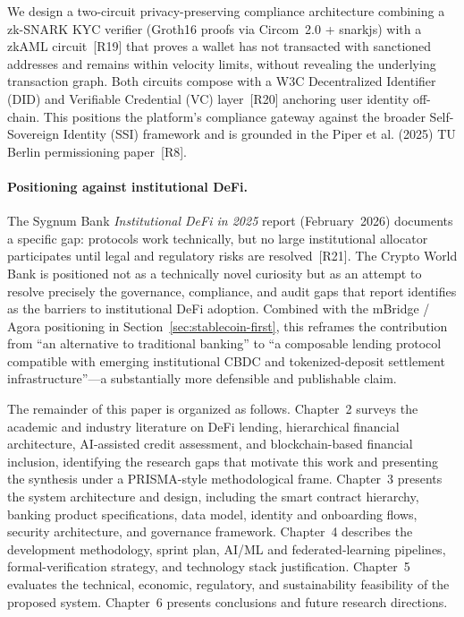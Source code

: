 \documentclass[12pt,a4paper]{report}
\begin{document}
\begin{description}[leftmargin=0pt]
\item[\textbf{Contribution 4 --- Compliance-Aware ZKP / zkAML Identity Pathway.}]
We design a two-circuit privacy-preserving compliance architecture combining a zk-SNARK KYC verifier (Groth16 proofs via Circom~2.0 + snarkjs) with a zkAML circuit~[R19] that proves a wallet has not transacted with sanctioned addresses and remains within velocity limits, without revealing the underlying transaction graph. Both circuits compose with a W3C Decentralized Identifier (DID) and Verifiable Credential (VC) layer~[R20] anchoring user identity off-chain. This positions the platform's compliance gateway against the broader Self-Sovereign Identity (SSI) framework and is grounded in the Piper et al. (2025) TU Berlin permissioning paper~[R8].

\end{description}

\paragraph{Positioning against institutional DeFi.}
The Sygnum Bank \textit{Institutional DeFi in 2025} report (February~2026) documents a specific gap: protocols work technically, but no large institutional allocator participates until legal and regulatory risks are resolved~[R21]. The Crypto World Bank is positioned not as a technically novel curiosity but as an attempt to resolve precisely the governance, compliance, and audit gaps that report identifies as the barriers to institutional DeFi adoption. Combined with the mBridge / Agora positioning in Section~\ref{sec:stablecoin-first}, this reframes the contribution from ``an alternative to traditional banking'' to ``a composable lending protocol compatible with emerging institutional CBDC and tokenized-deposit settlement infrastructure''---a substantially more defensible and publishable claim.

The remainder of this paper is organized as follows. Chapter~2 surveys the academic and industry literature on DeFi lending, hierarchical financial architecture, AI-assisted credit assessment, and blockchain-based financial inclusion, identifying the research gaps that motivate this work and presenting the synthesis under a PRISMA-style methodological frame. Chapter~3 presents the system architecture and design, including the smart contract hierarchy, banking product specifications, data model, identity and onboarding flows, security architecture, and governance framework. Chapter~4 describes the development methodology, sprint plan, AI/ML and federated-learning pipelines, formal-verification strategy, and technology stack justification. Chapter~5 evaluates the technical, economic, regulatory, and sustainability feasibility of the proposed system. Chapter~6 presents conclusions and future research directions.
\end{document}
